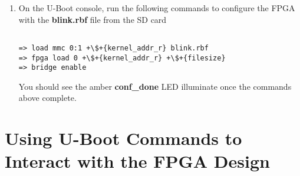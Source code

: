 \begin{flushleft}
\begin{enumerate}[
	label=\textbf{Step \arabic*.},
	leftmargin=*,
	widest={00},
	align=left]
\begin{verbatim}
U-Boot 2017.03-rc2 (Mar 30 2017 - 19:07:16 -0700)

CPU:   Altera SoCFPGA Platform
FPGA:  Altera Cyclone V, SE/A6 or SX/C6 or ST/D6, version 0x0
BOOT:  SD/MMC Internal Transceiver (3.0V)
       Watchdog enabled
I2C:   ready
DRAM:  1 GiB
MMC:   dwmmc0@ff704000: 0
*** Warning - bad CRC, using default environment

In:    serial
Out:   serial
Err:   serial
Model: Terasic DE10-Nano
Net:
Error: ethernet@ff702000 address not set.
No ethernet found.
Hit any key to stop autoboot:  0
=>

\end{verbatim}

\item On the U-Boot console, run the following commands to configure the FPGA with the \textbf{blink.rbf} file from the SD card

\begin{verbatim}

=> load mmc 0:1 +\$+{kernel_addr_r} blink.rbf
=> fpga load 0 +\$+{kernel_addr_r} +\$+{filesize}
=> bridge enable

\end{verbatim}

You should see the amber \textbf{conf\_done} LED illuminate once the commands above complete.

\end{enumerate}

\end{flushleft}

\section*{Using U-Boot Commands to Interact with the FPGA Design}

